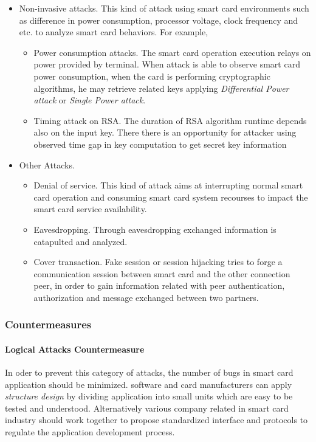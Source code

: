 \begin{itemize}
\begin{itemize}
\end{itemize}
\item Non-invasive attacks. This kind of attack using smart card environments such as difference in power consumption, processor voltage, clock frequency and etc. to analyze smart card behaviors. For example,
\begin{itemize}
\item Power consumption attacks. The smart card operation execution relays on power provided by terminal.  When attack is able to observe smart card power consumption, when the card is performing cryptographic algorithms, he may retrieve related keys applying \emph{Differential Power attack} or \emph{Single Power attack}\cite{smart_card_attack3}.
\item Timing attack on RSA. The duration of RSA algorithm runtime depends also on the input key. There there is an opportunity for attacker using observed time gap in key computation to get secret key information\cite{smart_card_history}
\end{itemize}
\item Other Attacks\cite{smart_card_attack5}.
\begin{itemize}
\item Denial of service. This kind of attack aims at interrupting normal smart card operation and consuming smart card system recourses to impact the smart card service availability.
\item Eavesdropping. Through eavesdropping exchanged information is catapulted and analyzed.
\item Cover transaction. Fake session or session hijacking tries to forge a communication session between smart card and the other connection peer, in order to gain information related with peer authentication, authorization and message exchanged between two partners.
\end{itemize}
\end{itemize}

\subsubsection{Countermeasures}
\paragraph{Logical Attacks Countermeasure}
In oder to prevent this category of attacks, the number of bugs in smart card application should be minimized. software and card manufacturers can apply \emph{structure design} by dividing application into small units which are easy to be tested and understood. Alternatively various company related in smart card industry should work together to propose standardized interface and protocols to regulate the application development process\cite{smart_card_attack2}.
